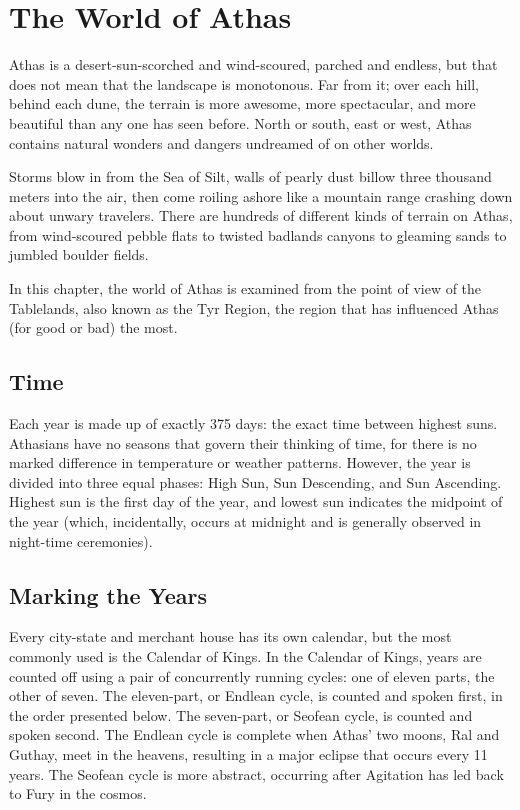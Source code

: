 \section{The World of Athas}
Athas is a desert-sun-scorched and wind-scoured, parched and endless, but that does not mean that the landscape is monotonous. Far from it; over each hill, behind each dune, the terrain is more awesome, more spectacular, and more beautiful than any one has seen before. North or south, east or west, Athas contains natural wonders and dangers undreamed of on other worlds.

Storms blow in from the Sea of Silt, walls of pearly dust billow three thousand meters into the air, then come roiling ashore like a mountain range crashing down about unwary travelers. There are hundreds of different kinds of terrain on Athas, from wind-scoured pebble flats to twisted badlands canyons to gleaming sands to jumbled boulder fields.

In this chapter, the world of Athas is examined from the point of view of the Tablelands, also known as the Tyr Region, the region that has influenced Athas (for good or bad) the most.

\subsection{Time}
Each year is made up of exactly 375 days: the exact time between highest suns. Athasians have no seasons that govern their thinking of time, for there is no marked difference in temperature or weather patterns. However, the year is divided into three equal phases: High Sun, Sun Descending, and Sun Ascending. Highest sun is the first day of the year, and lowest sun indicates the midpoint of the year (which, incidentally, occurs at midnight and is generally observed in night-time ceremonies).

\subsection{Marking the Years}
Every city-state and merchant house has its own calendar, but the most commonly used is the Calendar of Kings. In the Calendar of Kings, years are counted off using a pair of concurrently running cycles: one of eleven parts, the other of seven. The eleven-part, or Endlean cycle, is counted and spoken first, in the order presented below. The seven-part, or Seofean cycle, is counted and spoken second. The Endlean cycle is complete when Athas' two moons, Ral and Guthay, meet in the heavens, resulting in a major eclipse that occurs every 11 years. The Seofean cycle is more abstract, occurring after Agitation has led back to Fury in the cosmos.

